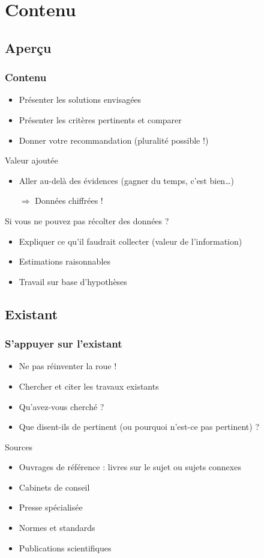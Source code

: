 \documentclass[french]{beamer}
\begin{document}
\section{Contenu}
\subsection{Aperçu}
\begin{frame}
	\frametitle{Contenu}
	\begin{itemize}
		\item Présenter les solutions envisagées
		\item Présenter les critères pertinents et comparer
		\item Donner votre recommandation (pluralité possible !)
	\end{itemize}
	\begin{block}{Valeur ajoutée}
				\begin{itemize}
					\item Aller au-delà des évidences (gagner du temps, c’est bien…)
					\item[$\Rightarrow$] Données \alert{chiffrées} !
				\end{itemize}
	\end{block}
	Si vous ne pouvez pas récolter des données ?
	\begin{itemize}
		\item Expliquer ce qu’il faudrait collecter (valeur de l’information)
		\item Estimations raisonnables
		\item Travail sur base d’hypothèses
	\end{itemize}
\end{frame}

\subsection{Existant}
\begin{frame}
	\frametitle{S’appuyer sur l’existant}
	\begin{itemize}
		\item Ne pas réinventer la roue !
		\item Chercher et citer les travaux existants
		\item Qu’avez-vous cherché ?
		\item Que disent-ils de pertinent (ou pourquoi n’est-ce pas pertinent) ?
	\end{itemize}
	\begin{block}{Sources}
		\begin{itemize}
			\item Ouvrages de référence : livres sur le sujet ou sujets connexes
			\item Cabinets de conseil
			\item Presse spécialisée
			\item Normes et standards
			\item Publications scientifiques
		\end{itemize}
	\end{block}
\end{frame}
\end{document}
